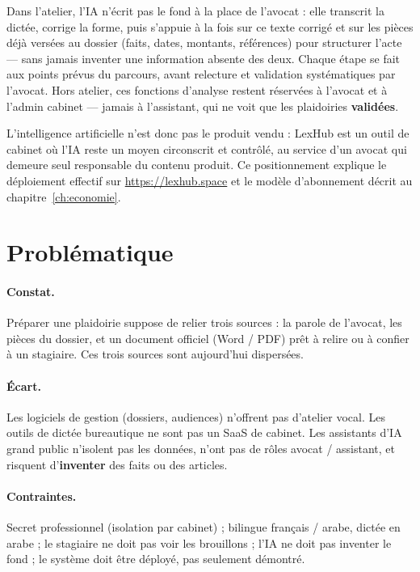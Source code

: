 Dans l'atelier, l'IA n'écrit pas le fond à la place de l'avocat : elle transcrit la dictée, corrige la forme, puis s'appuie à la fois sur ce texte corrigé et sur les pièces déjà versées au dossier (faits, dates, montants, références) pour structurer l'acte --- sans jamais inventer une information absente des deux. Chaque étape se fait aux points prévus du parcours, avant relecture et validation systématiques par l'avocat. Hors atelier, ces fonctions d'analyse restent réservées à l'avocat et à l'admin cabinet --- jamais à l'assistant, qui ne voit que les plaidoiries \textbf{validées}.

L'intelligence artificielle n'est donc pas le produit vendu : LexHub est un outil de cabinet où l'IA reste un moyen circonscrit et contrôlé, au service d'un avocat qui demeure seul responsable du contenu produit. Ce positionnement explique le déploiement effectif sur \url{https://lexhub.space} et le modèle d'abonnement décrit au chapitre~\ref{ch:economie}.
\section{Problématique}
\label{sec:problematique}

\paragraph{Constat.}
Préparer une plaidoirie suppose de relier trois sources : la parole de l'avocat, les pièces du dossier, et un document officiel (Word / PDF) prêt à relire ou à confier à un stagiaire. Ces trois sources sont aujourd'hui dispersées.

\paragraph{Écart.}
Les logiciels de gestion (dossiers, audiences) n'offrent pas d'atelier vocal. Les outils de dictée bureautique ne sont pas un SaaS de cabinet. Les assistants d'IA grand public n'isolent pas les données, n'ont pas de rôles avocat / assistant, et risquent d'\textbf{inventer} des faits ou des articles.

\paragraph{Contraintes.}
Secret professionnel (isolation par cabinet) ; bilingue français / arabe, dictée en arabe ; le stagiaire ne doit pas voir les brouillons ; l'IA ne doit pas inventer le fond ; le système doit être déployé, pas seulement démontré.


